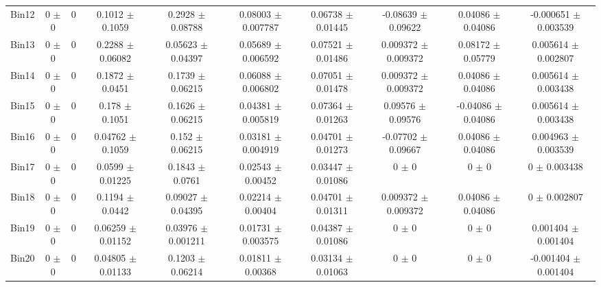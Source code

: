 \begin{tabular}{@{\extracolsep{4pt}}lccccccccc@{}}
     Bin12 & 0 $\pm$ 0 & 0 & 0.1012 $\pm$ 0.1059 & 0.2928 $\pm$ 0.08788 & 0.08003 $\pm$ 0.007787 & 0.06738 $\pm$ 0.01445 & -0.08639 $\pm$ 0.09622 & 0.04086 $\pm$ 0.04086 & -0.000651 $\pm$ 0.003539 \\ 
     Bin13 & 0 $\pm$ 0 & 0 & 0.2288 $\pm$ 0.06082 & 0.05623 $\pm$ 0.04397 & 0.05689 $\pm$ 0.006592 & 0.07521 $\pm$ 0.01486 & 0.009372 $\pm$ 0.009372 & 0.08172 $\pm$ 0.05779 & 0.005614 $\pm$ 0.002807 \\ 
     Bin14 & 0 $\pm$ 0 & 0 & 0.1872 $\pm$ 0.0451 & 0.1739 $\pm$ 0.06215 & 0.06088 $\pm$ 0.006802 & 0.07051 $\pm$ 0.01478 & 0.009372 $\pm$ 0.009372 & 0.04086 $\pm$ 0.04086 & 0.005614 $\pm$ 0.003438 \\ 
     Bin15 & 0 $\pm$ 0 & 0 & 0.178 $\pm$ 0.1051 & 0.1626 $\pm$ 0.06215 & 0.04381 $\pm$ 0.005819 & 0.07364 $\pm$ 0.01263 & 0.09576 $\pm$ 0.09576 & -0.04086 $\pm$ 0.04086 & 0.005614 $\pm$ 0.003438 \\ 
     Bin16 & 0 $\pm$ 0 & 0 & 0.04762 $\pm$ 0.1059 & 0.152 $\pm$ 0.06215 & 0.03181 $\pm$ 0.004919 & 0.04701 $\pm$ 0.01273 & -0.07702 $\pm$ 0.09667 & 0.04086 $\pm$ 0.04086 & 0.004963 $\pm$ 0.003539 \\ 
     Bin17 & 0 $\pm$ 0 & 0 & 0.0599 $\pm$ 0.01225 & 0.1843 $\pm$ 0.0761 & 0.02543 $\pm$ 0.00452 & 0.03447 $\pm$ 0.01086 & 0 $\pm$ 0 & 0 $\pm$ 0 & 0 $\pm$ 0.003438 \\ 
     Bin18 & 0 $\pm$ 0 & 0 & 0.1194 $\pm$ 0.0442 & 0.09027 $\pm$ 0.04395 & 0.02214 $\pm$ 0.00404 & 0.04701 $\pm$ 0.01311 & 0.009372 $\pm$ 0.009372 & 0.04086 $\pm$ 0.04086 & 0 $\pm$ 0.002807 \\ 
     Bin19 & 0 $\pm$ 0 & 0 & 0.06259 $\pm$ 0.01152 & 0.03976 $\pm$ 0.001211 & 0.01731 $\pm$ 0.003575 & 0.04387 $\pm$ 0.01086 & 0 $\pm$ 0 & 0 $\pm$ 0 & 0.001404 $\pm$ 0.001404 \\ 
     Bin20 & 0 $\pm$ 0 & 0 & 0.04805 $\pm$ 0.01133 & 0.1203 $\pm$ 0.06214 & 0.01811 $\pm$ 0.00368 & 0.03134 $\pm$ 0.01063 & 0 $\pm$ 0 & 0 $\pm$ 0 & -0.001404 $\pm$ 0.001404 \\ 
\hline\hline
  \end{tabular}

